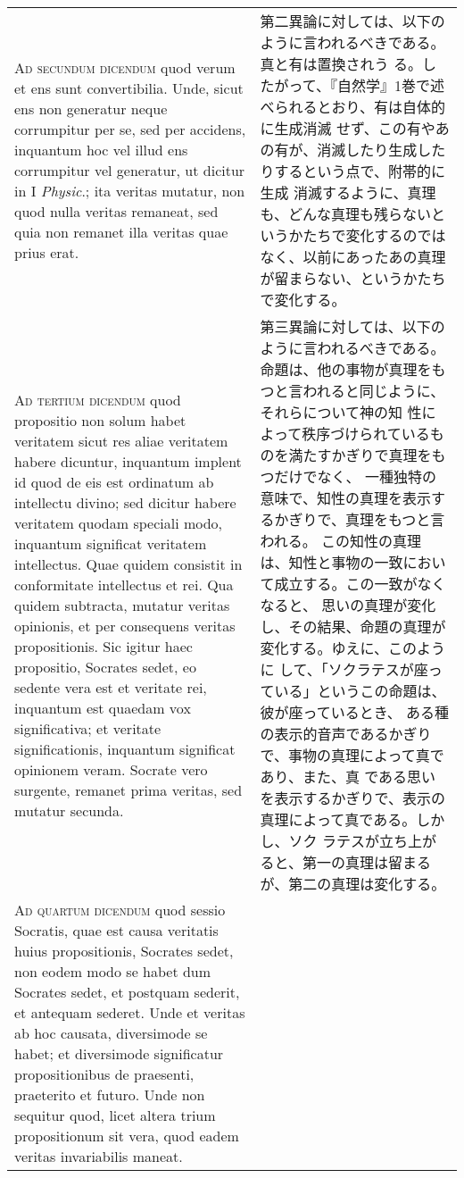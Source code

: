 \documentclass[10pt]{jsarticle} %
\begin{document}
\begin{longtable}{p{21em}p{21em}}
{\scshape Ad secundum dicendum} quod verum et ens sunt
convertibilia. Unde, sicut ens non generatur neque corrumpitur per se,
sed per accidens, inquantum hoc vel illud ens corrumpitur vel generatur,
ut dicitur in I {\itshape Physic}.; ita veritas mutatur, non quod nulla
veritas remaneat, sed quia non remanet illa veritas quae prius erat.

& 

第二異論に対しては、以下のように言われるべきである。真と有は置換されう
る。したがって、『自然学』1巻で述べられるとおり、有は自体的に生成消滅
せず、この有やあの有が、消滅したり生成したりするという点で、附帯的に生成
消滅するように、真理も、どんな真理も残らないというかたちで変化するのでは
 なく、以前にあったあの真理が留まらない、というかたちで変化する。


\\


{\scshape Ad tertium dicendum} quod propositio
non solum habet veritatem sicut res aliae veritatem habere dicuntur,
inquantum implent id quod de eis est ordinatum ab intellectu divino; sed
dicitur habere veritatem quodam speciali modo, inquantum significat
veritatem intellectus. Quae quidem consistit in conformitate intellectus
et rei. Qua quidem subtracta, mutatur veritas opinionis, et per
consequens veritas propositionis. Sic igitur haec propositio, Socrates
sedet, eo sedente vera est et veritate rei, inquantum est quaedam vox
significativa; et veritate significationis, inquantum significat
opinionem veram. Socrate vero surgente, remanet prima veritas, sed
mutatur secunda.

&

第三異論に対しては、以下のように言われるべきである。
命題は、他の事物が真理をもつと言われると同じように、それらについて神の知
 性によって秩序づけられているものを満たすかぎりで真理をもつだけでなく、
 一種独特の意味で、知性の真理を表示するかぎりで、真理をもつと言われる。
この知性の真理は、知性と事物の一致において成立する。この一致がなくなると、
 思いの真理が変化し、その結果、命題の真理が変化する。ゆえに、このように
 して、「ソクラテスが座っている」というこの命題は、彼が座っているとき、
 ある種の表示的音声であるかぎりで、事物の真理によって真であり、また、真
 である思いを表示するかぎりで、表示の真理によって真である。しかし、ソク
 ラテスが立ち上がると、第一の真理は留まるが、第二の真理は変化する。

\\


{\scshape Ad quartum dicendum} quod sessio
Socratis, quae est causa veritatis huius propositionis, Socrates sedet,
non eodem modo se habet dum Socrates sedet, et postquam sederit, et
antequam sederet. Unde et veritas ab hoc causata, diversimode se habet;
et diversimode significatur propositionibus de praesenti, praeterito et
futuro. Unde non sequitur quod, licet altera trium propositionum sit
vera, quod eadem veritas invariabilis maneat.


\end{longtable}
\end{document}
